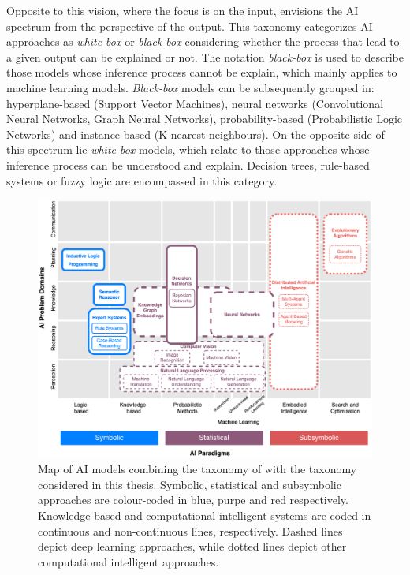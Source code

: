 Opposite to this vision, where the focus is on the input, \citep{loyola-gonzalez_black-box_2019} envisions the AI spectrum from the perspective of the output. This taxonomy categorizes AI approaches as \textit{white-box} or \textit{black-box} considering whether the process that lead to a given output can be explained or not. The notation \textit{black-box} is used to describe those models whose inference process cannot be explain, which mainly applies to machine learning models.  \textit{Black-box} models can be subsequently grouped in: hyperplane-based (Support Vector Machines), neural networks (Convolutional Neural Networks, Graph Neural Networks), probability-based (Probabilistic Logic Networks) and instance-based (K-nearest neighbours). On the opposite side of this spectrum lie \textit{white-box} models, which relate to those approaches whose inference process can be understood and explain. Decision trees, rule-based systems or fuzzy logic are encompassed in this category.


\begin{figure}
    \centering
    \includegraphics[width=\linewidth]{3_stateoftheart/figures/AI_Map.eps}
    \caption{Map of AI models combining the taxonomy of \citep{corea_ai_2019} with the taxonomy considered in this thesis. Symbolic, statistical and subsymbolic approaches are colour-coded in blue, purpe and red respectively. Knowledge-based and computational intelligent systems are coded in continuous and non-continuous lines, respectively. Dashed lines depict deep learning approaches, while dotted lines depict other computational intelligent approaches.}
    \label{fig:ai_map}
\end{figure}


